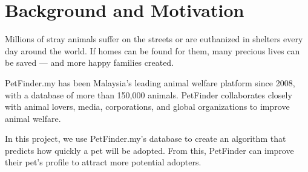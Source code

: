 \section{Background and Motivation}\label{Background} 
Millions of stray animals suffer on the streets or are euthanized in shelters every day around the world. If homes can be found for them, many precious lives can be saved --- and more happy families created. 

PetFinder.my has been Malaysia's leading animal welfare platform since 2008, with a database of more than 150,000 animals. PetFinder collaborates closely with animal lovers, media, corporations, and global organizations to improve animal welfare.

In this project, we use PetFinder.my's database to create an algorithm that predicts how quickly a pet will be adopted. From this, PetFinder can improve their pet's profile to attract more potential adopters. 







